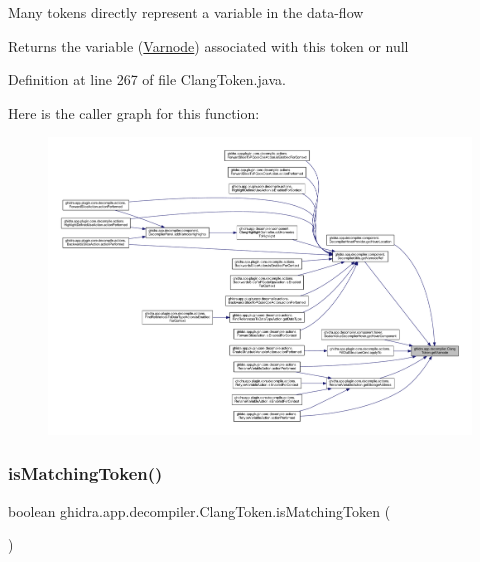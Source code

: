 Many tokens directly represent a variable in the data-\/flow \begin{DoxyReturn}{Returns}
the variable (\mbox{\hyperlink{class_varnode}{Varnode}}) associated with this token or null 
\end{DoxyReturn}


Definition at line 267 of file Clang\+Token.\+java.

Here is the caller graph for this function\+:
\nopagebreak
\begin{figure}[H]
\begin{center}
\leavevmode
\includegraphics[width=350pt]{classghidra_1_1app_1_1decompiler_1_1_clang_token_a21f48d0c10bcae5c9d19d1f99fc6a407_icgraph}
\end{center}
\end{figure}
\mbox{\label{classghidra_1_1app_1_1decompiler_1_1_clang_token_af3a83e7be8996293de2312e2a802e42b}} 
\subsubsection{\texorpdfstring{isMatchingToken()}{isMatchingToken()}}
{\footnotesize\ttfamily boolean ghidra.\+app.\+decompiler.\+Clang\+Token.\+is\+Matching\+Token (\begin{DoxyParamCaption}{ }\end{DoxyParamCaption})\hspace{0.3cm}{\ttfamily [inline]}}



